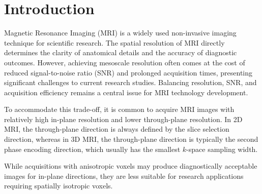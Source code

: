 \documentclass[AMA,STIX2COL]{MRM}
\begin{document}



\maketitle



\section{Introduction}\label{intro}
Magnetic Resonance Imaging (MRI) is a widely used non-invasive imaging technique for scientific research. The spatial resolution of MRI directly determines the clarity of anatomical details and the accuracy of diagnostic outcomes. However, achieving mesoscale resolution often comes at the cost of reduced signal-to-noise ratio (SNR) and prolonged acquisition times, presenting significant challenges to current research studies\cite{sui2020slimm}. Balancing resolution, SNR, and acquisition efficiency remains a central issue for MRI technology development\cite{plenge2012super}.


To accommodate this trade-off, it is common to acquire MRI images with relatively high in-plane resolution and lower through-plane resolution\cite{zhao2020smore}. In 2D MRI, the through-plane direction is always defined by the slice selection direction, whereas in 3D MRI, the through-plane direction is typically the second phase encoding direction, which usually has the smallest $k$-space sampling width.%

While acquisitions with anisotropic voxels may produce diagnostically acceptable images for in-plane directions, they are less suitable for research applications requiring spatially isotropic voxels.
\end{document}
